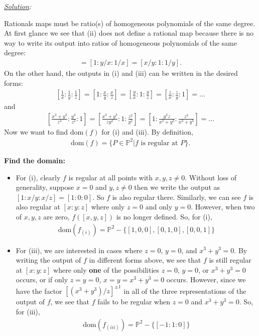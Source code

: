 \documentclass[12pt]{article}
\newcommand{\f}[2]{\frac{#1}{#2}}
\begin{document}
\noindent \textit{\underline{Solution}:}

Rationals maps must be ratio(s) of homogeneous polynomials of the same degree. At first glance we see that (ii) does not define a rational map because there is no way to write its output into ratios of homogeneous polynomials of the same degree: 
\begin{align*}
[x:y:1] = [1:y/x:1/x] = [x/y:1:1/y].
\end{align*}
On the other hand, the outputs in (i) and (iii) can be written in the desired forms:
\begin{align*}
\left[\frac{1}{x}:\f{1}{y}:\f{1}{z}\right] = \left[1:\f{x}{y}:\f{x}{z}\right] = \left[\f{y}{x}:1:\f{y}{z}\right] = \left[\f{z}{x}:\f{z}{y}:1\right] = \dots
\end{align*}
and
\begin{align*}
\left[ \f{x^3 + y^3}{z^3} : \f{y^2}{z^2} :  1 \right] = \left[ \f{x^3 + y^3}{zy^2} : 1 : \f{z^2}{y^2} \right] = \left[ 1 : \f{y^2z}{x^3+y^3} : \f{z^3}{ x^3 + y^3} \right] = \dots
\end{align*}
Now we want to find $\mbox{dom}(f)$ for (i) and (iii). By definition, 
\begin{align*}
\mbox{dom}(f) = \{ P\in \mathbb{P}^2 \vert f \mbox{ is regular at } P \}.
\end{align*}

\noindent \textbf{Find the domain:}
\begin{itemize}
\item For (i), clearly $f$ is regular at all points with $x,y,z \neq 0$. Without loss of generality, suppose $x=0$ and $y,z\neq 0$ then we write the output as $[1:x/y:x/z] = [1:0:0] $. So $f$ is also regular there. Similarly, we can see $f$ is also regular at $[x:y:z]$ where only $z=0$ and only $y=0$. However, when two of $x,y,z$ are zero, $f([x,y,z])$ is no longer defined. So, for (i),
\begin{align*}
\boxed{\mbox{dom}(f_{(i)}) = \mathbb{P}^2 - \{ [1,0,0],[0,1,0],[0,0,1] \}}
\end{align*} 

\item For (iii), we are interested in cases where $z = 0$,  $y=0$, and $x^3 + y^3 = 0$. By writing the output of $f$ in different forms above, we see that $f$ is still regular at $[x:y:z]$ where only \textbf{one} of the possibilities $z = 0$,  $y=0$, or $x^3 + y^3 = 0$ occurs, or if only $z=y=0$, $x=y=x^3+y^3=0$ occurs. However, since we have the factor $[(x^3+y^3)/z]^{\pm 1}$ in all of the three representations of the output of $f$, we see that $f$ fails to be regular when $z=0$ and $x^3 + y^3 = 0$. So, for (iii),
\begin{align*}
\boxed{\mbox{dom}(f_{(iii)}) = \mathbb{P}^2 - \{[-1:1:0]\}}
\end{align*} 
\end{itemize}
\end{document}
